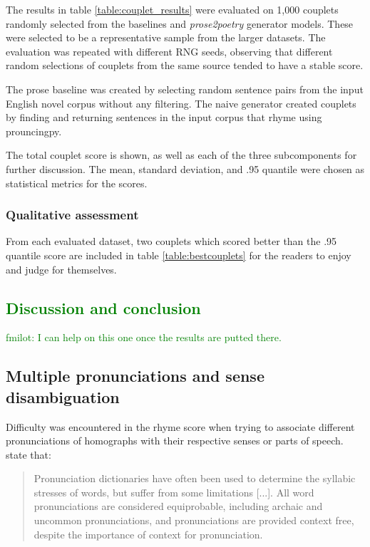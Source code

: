\documentclass[11pt,a4paper]{article}
\begin{document}
The results in table \ref{table:couplet_results} were evaluated on 1,000 couplets randomly selected from the baselines and \textit{prose2poetry} generator models. These were selected to be a representative sample from the larger datasets. The evaluation was repeated with different RNG seeds, observing that different random selections of couplets from the same source tended to have a stable score.

The prose baseline was created by selecting random sentence pairs from the input English novel corpus without any filtering. The naive generator created couplets by finding and returning sentences in the input corpus that rhyme using prouncingpy.

The total couplet score is shown, as well as each of the three subcomponents for further discussion. The mean, standard deviation, and .95 quantile were chosen as statistical metrics for the scores.

\subsubsection{Qualitative assessment}

From each evaluated dataset, two couplets which scored better than the .95 quantile score are included in table \ref{table:bestcouplets} for the readers to enjoy and judge for themselves.

\textcolor{green}{
\section{Discussion and conclusion}
\label{sec:discconc}
fmilot: I can help on this one once the results are putted there.
}

\subsection{Multiple pronunciations and sense disambiguation}
\label{sec:synset}

Difficulty was encountered in the rhyme score when trying to associate different pronunciations of homographs with their respective senses or parts of speech. \citet{hopkins-kiela-2017} state that:

\begin{quote}
Pronunciation dictionaries have often been used to determine the syllabic stresses of words, but suffer from some limitations [...]. All word pronunciations are considered equiprobable, including archaic and uncommon pronunciations, and pronunciations are provided context free, despite the importance of context for pronunciation.
\end{quote}
\end{document}
